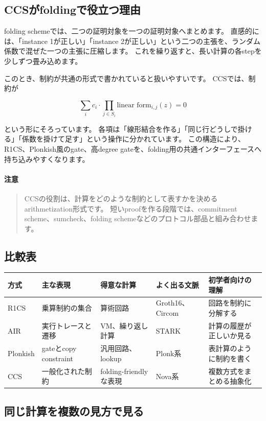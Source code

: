 \documentclass[a4paper,11pt]{ltjsarticle}
\newenvironment{warnbox}{%
  \paragraph*{注意}\begin{quote}
}{%
  \end{quote}
}
\begin{document}
\subsection{CCSがfoldingで役立つ理由}

folding schemeでは、二つの証明対象を一つの証明対象へまとめます。
直感的には、「instance 1が正しい」「instance 2が正しい」という二つの主張を、ランダム係数で混ぜた一つの主張に圧縮します。
これを繰り返すと、長い計算の各stepを少しずつ畳み込めます。

このとき、制約が共通の形式で書かれていると扱いやすいです。
CCSでは、制約が

\[
  \sum_i c_i\cdot\prod_{j\in S_i}\text{linear form}_{i,j}(z)=0
\]

という形にそろっています。
各項は「線形結合を作る」「同じ行どうしで掛ける」「係数を掛けて足す」という操作に分かれています。
この構造により、R1CS、Plonkish風のgate、高degree gateを、folding用の共通インターフェースへ持ち込みやすくなります。

\begin{warnbox}
CCSの役割は、計算をどのような制約として表すかを決めるarithmetization形式です。
短いproofを作る段階では、commitment scheme、sumcheck、folding schemeなどのプロトコル部品と組み合わせます。
\end{warnbox}

\subsection{比較表}

\begin{center}
\begin{tabularx}{\linewidth}{@{}lYYYY@{}}
\toprule
方式 & 主な表現 & 得意な計算 & よく出る文脈 & 初学者向けの理解 \\
\midrule
R1CS & 乗算制約の集合 & 算術回路 & Groth16、Circom & 回路を制約に分解する \\
AIR & 実行トレースと遷移 & VM、繰り返し計算 & STARK & 計算の履歴が正しいか見る \\
Plonkish & gateとcopy constraint & 汎用回路、lookup & Plonk系 & 表計算のように制約を書く \\
CCS & 一般化された制約 & folding-friendlyな表現 & Nova系 & 複数方式をまとめる抽象化 \\
\bottomrule
\end{tabularx}
\end{center}

\subsection{同じ計算を複数の見方で見る}
\end{document}
